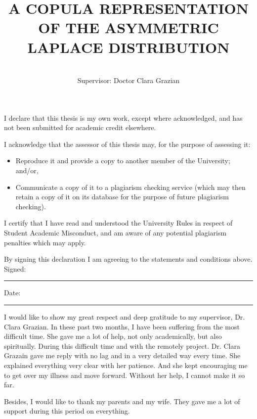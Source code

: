 \documentclass[mstat,12pt]{unswthesis}  %
\title{A COPULA REPRESENTATION OF THE ASYMMETRIC LAPLACE DISTRIBUTION}
\author{\Authornameonly\\{\bigskip}Supervisor: Doctor Clara Grazian}
\newcommand\blankpage{%
    \null
    \thispagestyle{empty}%
    \addtocounter{page}{-1}%
    \newpage}
\numberwithin{equation}{section}
\begin{document}
\beforepreface

\afterpage{\blankpage}



\vskip 10pc \noindent I declare that this thesis is my
own work, except where acknowledged, and has not been submitted for
academic credit elsewhere. 

\vskip 2pc  \noindent I acknowledge that the assessor of this
thesis may, for the purpose of assessing it:
\begin{itemize}
\item Reproduce it and provide a copy to another member of the University; and/or,
\item Communicate a copy of it to a plagiarism checking service (which may then retain a copy of it on its database for the purpose of future plagiarism checking).
\end{itemize}

\vskip 2pc \noindent I certify that I have read and understood the University Rules in
respect of Student Academic Misconduct, and am aware of any potential plagiarism penalties which may 
apply.\vspace{24pt}

\vskip 2pc \noindent By signing 
this declaration I am
agreeing to the statements and conditions above.
\vskip 2pc \noindent
Signed: \rule{7cm}{0.25pt} \hfill Date: \rule{4cm}{0.25pt} \newline
\vskip 1pc

\afterpage{\blankpage}




{\bigskip}I would like to show my great respect and deep gratitude to my supervisor, Dr. Clara Grazian. In these past two months, I have been suffering from the most difficult time. She gave me a lot of help, not only academically, but also spiritually. During this difficult time and with the remotely project. Dr. Clara Grazain gave me reply with no lag and in a very detailed way every time. She explained everything very clear with her patience. And she kept encouraging me to get over my illness and move forward. Without her help, I cannot make it so far.

{\bigskip\noindent}Besides, I would like to thank my parents and my wife. They gave me a lot of support during this period on everything.
\end{document}
